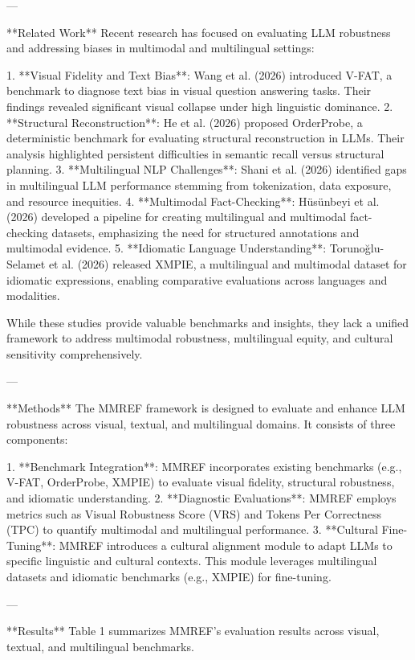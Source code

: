 ---

**Related Work**  
Recent research has focused on evaluating LLM robustness and addressing biases in multimodal and multilingual settings:  

1. **Visual Fidelity and Text Bias**: Wang et al. (2026) introduced V-FAT, a benchmark to diagnose text bias in visual question answering tasks. Their findings revealed significant visual collapse under high linguistic dominance.  
2. **Structural Reconstruction**: He et al. (2026) proposed OrderProbe, a deterministic benchmark for evaluating structural reconstruction in LLMs. Their analysis highlighted persistent difficulties in semantic recall versus structural planning.  
3. **Multilingual NLP Challenges**: Shani et al. (2026) identified gaps in multilingual LLM performance stemming from tokenization, data exposure, and resource inequities.  
4. **Multimodal Fact-Checking**: Hüsünbeyi et al. (2026) developed a pipeline for creating multilingual and multimodal fact-checking datasets, emphasizing the need for structured annotations and multimodal evidence.  
5. **Idiomatic Language Understanding**: Torunoğlu-Selamet et al. (2026) released XMPIE, a multilingual and multimodal dataset for idiomatic expressions, enabling comparative evaluations across languages and modalities.  

While these studies provide valuable benchmarks and insights, they lack a unified framework to address multimodal robustness, multilingual equity, and cultural sensitivity comprehensively.  

---

**Methods**  
The MMREF framework is designed to evaluate and enhance LLM robustness across visual, textual, and multilingual domains. It consists of three components:  

1. **Benchmark Integration**: MMREF incorporates existing benchmarks (e.g., V-FAT, OrderProbe, XMPIE) to evaluate visual fidelity, structural robustness, and idiomatic understanding.  
2. **Diagnostic Evaluations**: MMREF employs metrics such as Visual Robustness Score (VRS) and Tokens Per Correctness (TPC) to quantify multimodal and multilingual performance.  
3. **Cultural Fine-Tuning**: MMREF introduces a cultural alignment module to adapt LLMs to specific linguistic and cultural contexts. This module leverages multilingual datasets and idiomatic benchmarks (e.g., XMPIE) for fine-tuning.  

---

**Results**  
Table 1 summarizes MMREF's evaluation results across visual, textual, and multilingual benchmarks.  

